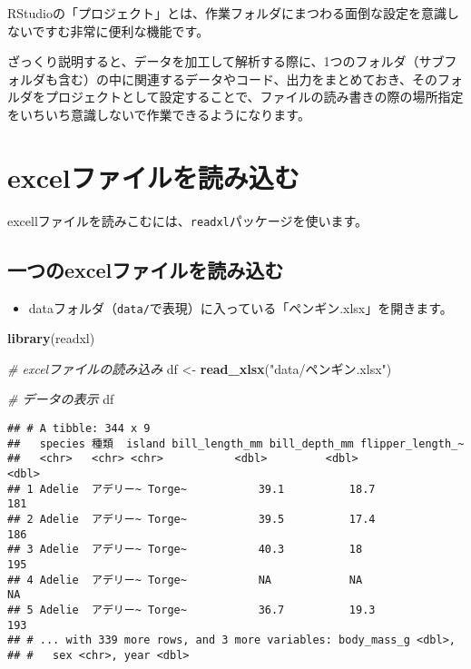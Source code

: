 \documentclass[
  xelatex,ja=standard, b5paper]{bxjsbook}
\newenvironment{Shaded}{\begin{snugshade}}{\end{snugshade}}
\newcommand{\CommentTok}[1]{\textcolor[rgb]{0.56,0.35,0.01}{\textit{#1}}}
\newcommand{\KeywordTok}[1]{\textcolor[rgb]{0.13,0.29,0.53}{\textbf{#1}}}
\newcommand{\NormalTok}[1]{#1}
\newcommand{\StringTok}[1]{\textcolor[rgb]{0.31,0.60,0.02}{#1}}
\providecommand{\tightlist}{%
  \setlength{\itemsep}{0pt}\setlength{\parskip}{0pt}}
\begin{document}
RStudioの「プロジェクト」とは、作業フォルダにまつわる面倒な設定を意識しないですむ非常に便利な機能です。

ざっくり説明すると、データを加工して解析する際に、1つのフォルダ（サブフォルダも含む）の中に関連するデータやコード、出力をまとめておき、そのフォルダをプロジェクトとして設定することで、ファイルの読み書きの際の場所指定をいちいち意識しないで作業できるようになります。

\hypertarget{readingexcel}{%
\part{excelファイルを読み込む}\label{readingexcel}}

excellファイルを読みこむには、\texttt{readxl}パッケージを使います。

\hypertarget{ux4e00ux3064ux306eexcelux30d5ux30a1ux30a4ux30ebux3092ux8aadux307fux8fbcux3080}{%
\chapter{一つのexcelファイルを読み込む}\label{ux4e00ux3064ux306eexcelux30d5ux30a1ux30a4ux30ebux3092ux8aadux307fux8fbcux3080}}

\begin{itemize}
\tightlist
\item
  dataフォルダ（\texttt{data/}で表現）に入っている「ペンギン.xlsx」を開きます。
\end{itemize}

\begin{Shaded}
\begin{Highlighting}[]
\KeywordTok{library}\NormalTok{(readxl)}

\CommentTok{# excelファイルの読み込み}
\NormalTok{df <-}\StringTok{ }
\StringTok{ }\KeywordTok{read_xlsx}\NormalTok{(}\StringTok{"data/ペンギン.xlsx"}\NormalTok{)}

\CommentTok{# データの表示}
\NormalTok{df}
\end{Highlighting}
\end{Shaded}

\begin{verbatim}
## # A tibble: 344 x 9
##   species 種類  island bill_length_mm bill_depth_mm flipper_length_~
##   <chr>   <chr> <chr>           <dbl>         <dbl>            <dbl>
## 1 Adelie  アデリー~ Torge~           39.1          18.7              181
## 2 Adelie  アデリー~ Torge~           39.5          17.4              186
## 3 Adelie  アデリー~ Torge~           40.3          18                195
## 4 Adelie  アデリー~ Torge~           NA            NA                 NA
## 5 Adelie  アデリー~ Torge~           36.7          19.3              193
## # ... with 339 more rows, and 3 more variables: body_mass_g <dbl>,
## #   sex <chr>, year <dbl>
\end{verbatim}
\end{document}
